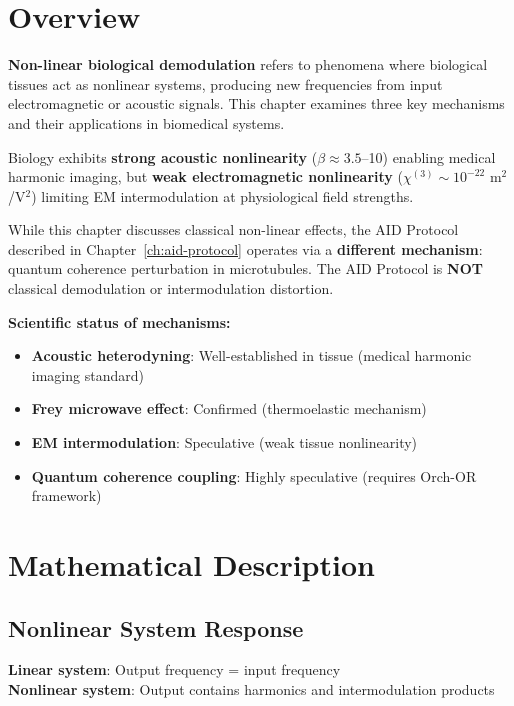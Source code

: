 \section{Overview}

\textbf{Non-linear biological demodulation} refers to phenomena where biological tissues act as nonlinear systems, producing new frequencies from input electromagnetic or acoustic signals. This chapter examines three key mechanisms and their applications in biomedical systems.

\begin{keyconcept}
Biology exhibits \textbf{strong acoustic nonlinearity} ($\beta \approx 3.5$--10) enabling medical harmonic imaging, but \textbf{weak electromagnetic nonlinearity} ($\chi^{(3)} \sim 10^{-22}$ m$^2$/V$^2$) limiting EM intermodulation at physiological field strengths.
\end{keyconcept}

\begin{importantbox}
While this chapter discusses classical non-linear effects, the AID Protocol described in Chapter~\ref{ch:aid-protocol} operates via a \textbf{different mechanism}: quantum coherence perturbation in microtubules. The AID Protocol is \textbf{NOT} classical demodulation or intermodulation distortion.
\end{importantbox}

\textbf{Scientific status of mechanisms:}
\begin{itemize}
\item \textbf{Acoustic heterodyning}: Well-established in tissue (medical harmonic imaging standard)
\item \textbf{Frey microwave effect}: Confirmed (thermoelastic mechanism)
\item \textbf{EM intermodulation}: Speculative (weak tissue nonlinearity)
\item \textbf{Quantum coherence coupling}: Highly speculative (requires Orch-OR framework)
\end{itemize}

\section{Mathematical Description}

\subsection{Nonlinear System Response}

\textbf{Linear system}: Output frequency = input frequency\\
\textbf{Nonlinear system}: Output contains harmonics and intermodulation products

